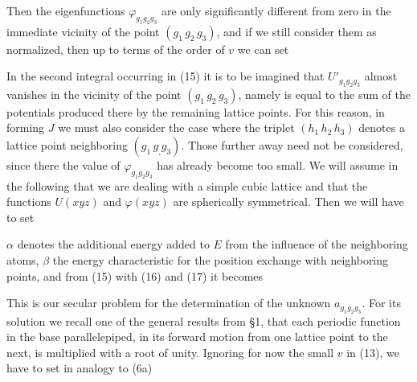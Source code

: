\begin{paper}{1}
Then the eigenfunctions $\varphi_{g_1g_2g_3}$ are only significantly different from zero in the immediate vicinity of the point $(g_1\,g_2\,g_3)$, and if we still consider them as normalized, then up to terms of the order of $v$ we can set

In the second integral occurring in (15)
it is to be imagined that $U'_{g_1g_2g_3}$ almost vanishes in the vicinity of the point $(g_1\,g_2\,g_3)$, namely is equal to the sum of the potentials produced there by the remaining lattice points. For this reason, in forming $J$ we must also consider the case where the triplet $(h_1\,h_2\,h_3)$ denotes a lattice point neighboring $(g_1\,g_,g_3)$. Those further away need not be considered, since there the value of $\varphi_{g_1g_2g_3}$ has already become too small. We will assume in the following that we are dealing with a simple cubic lattice and that the functions $U(xyz)$ and $\varphi(xyz)$ are spherically symmetrical. Then we will have to set

$\alpha$ denotes the additional energy added to $E$ from the influence of the neighboring atoms, $\beta$ the energy characteristic for the position exchange with neighboring points, and from (15) with (16) and (17) it becomes

This is our secular problem for the determination of the unknown $a_{g_1g_2g_3}$. For its solution we recall one of the general results from \S1, that each periodic function in the base parallelepiped, in its forward motion from one lattice point to the next, is multiplied with a root of unity. Ignoring for now the small  $v$ in (13), we have to set in analogy to (6a)


\end{paper}
